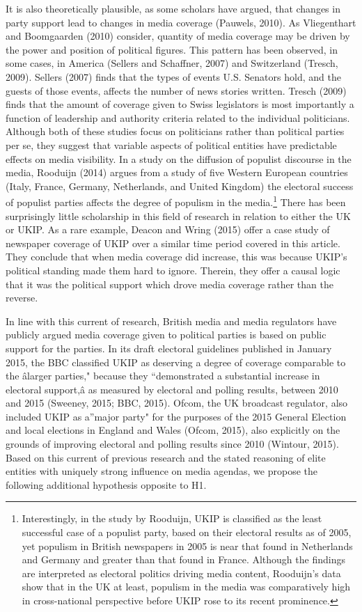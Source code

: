 \documentclass[12pt,article]{article}
\let\rmarkdownfootnote\footnote%
\def\footnote{\protect\rmarkdownfootnote}
\begin{document}
It is also theoretically plausible, as some scholars have argued, that
changes in party support lead to changes in media coverage (Pauwels,
2010). As Vliegenthart and Boomgaarden (2010) consider, quantity of
media coverage may be driven by the power and position of political
figures. This pattern has been observed, in some cases, in America
(Sellers and Schaffner, 2007) and Switzerland (Tresch, 2009). Sellers
(2007) finds that the types of events U.S. Senators hold, and the guests
of those events, affects the number of news stories written. Tresch
(2009) finds that the amount of coverage given to Swiss legislators is
most importantly a function of leadership and authority criteria related
to the individual politicians. Although both of these studies focus on
politicians rather than political parties per se, they suggest that
variable aspects of political entities have predictable effects on media
visibility. In a study on the diffusion of populist discourse in the
media, Rooduijn (2014) argues from a study of five Western European
countries (Italy, France, Germany, Netherlands, and United Kingdom) the
electoral success of populist parties affects the degree of populism in
the
media.\footnote{Interestingly, in the study by Rooduijn, UKIP is classified as the least successful case of a populist party, based on their electoral results as of 2005, yet populism in British newspapers in 2005 is near that found in Netherlands and Germany and greater than that found in France. Although the findings are interpreted as electoral politics driving media content, Rooduijn's data show that in the UK at least, populism in the media was comparatively high in cross-national perspective before UKIP rose to its recent prominence.}
There has been surprisingly little scholarship in this field of research
in relation to either the UK or UKIP. As a rare example, Deacon and
Wring (2015) offer a case study of newspaper coverage of UKIP over a
similar time period covered in this article. They conclude that when
media coverage did increase, this was because UKIP's political standing
made them hard to ignore. Therein, they offer a causal logic that it was
the political support which drove media coverage rather than the
reverse.

In line with this current of research, British media and media
regulators have publicly argued media coverage given to political
parties is based on public support for the parties. In its draft
electoral guidelines published in January 2015, the BBC classified UKIP
as deserving a degree of coverage comparable to the âlarger parties,"
because they ``demonstrated a substantial increase in electoral
support,â as measured by electoral and polling results, between 2010
and 2015 (Sweeney, 2015; BBC, 2015). Ofcom, the UK broadcast regulator,
also included UKIP as a''major party" for the purposes of the 2015
General Election and local elections in England and Wales (Ofcom, 2015),
also explicitly on the grounds of improving electoral and polling
results since 2010 (Wintour, 2015). Based on this current of previous
research and the stated reasoning of elite entities with uniquely strong
influence on media agendas, we propose the following additional
hypothesis opposite to H1.
\end{document}
